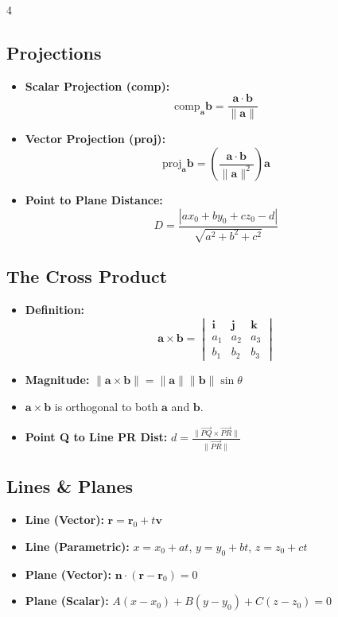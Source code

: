 \documentclass[8pt, landscape, a4paper]{scrartcl}
\begin{document}
\begin{multicols*}{4}
\subsection*{Projections}
\begin{itemize}
    \item \textbf{Scalar Projection (comp):} \[\text{comp}_\mathbf{a} \mathbf{b} = \frac{\mathbf{a} \cdot \mathbf{b}}{\lVert\mathbf{a}\rVert}\]
    \item \textbf{Vector Projection (proj):} \[\text{proj}_\mathbf{a} \mathbf{b} = \left(\frac{\mathbf{a} \cdot \mathbf{b}}{\lVert\mathbf{a}\rVert^2}\right) \mathbf{a}\]
    \item \textbf{Point to Plane Distance:} \[D = \frac{|ax_0+by_0+cz_0-d|}{\sqrt{a^2+b^2+c^2}}\]
\end{itemize}

\subsection*{The Cross Product}
\begin{itemize}
    \item \textbf{Definition:} 
            \[
            \mathbf{a} \times \mathbf{b} = 
            \begin{vmatrix} 
            \mathbf{i} & \mathbf{j} & \mathbf{k} \\ 
            a_1 & a_2 & a_3 \\ 
            b_1 & b_2 & b_3 
            \end{vmatrix}
            \]
    \item \textbf{Magnitude:} $\lVert\mathbf{a} \times \mathbf{b}\rVert = \lVert\mathbf{a}\rVert \lVert\mathbf{b}\rVert \sin \theta$
    \item $\mathbf{a} \times \mathbf{b}$ is orthogonal to both $\mathbf{a}$ and $\mathbf{b}$.
    \item \textbf{Point Q to Line PR Dist:} $d = \frac{\lVert\vec{PQ} \times \vec{PR}\rVert}{\lVert\vec{PR}\rVert}$
\end{itemize}

\subsection*{Lines \& Planes}
\begin{itemize}
    \item \textbf{Line (Vector):} $\mathbf{r} = \mathbf{r}_0 + t\mathbf{v}$
    \item \textbf{Line (Parametric):} $x = x_0+at$, $y = y_0+bt$, $z = z_0+ct$
    \item \textbf{Plane (Vector):} $\mathbf{n} \cdot (\mathbf{r} - \mathbf{r}_0) = 0$
    \item \textbf{Plane (Scalar):} $A(x-x_0) + B(y-y_0) + C(z-z_0) = 0$
\end{itemize}


\end{multicols*}
\end{document}
